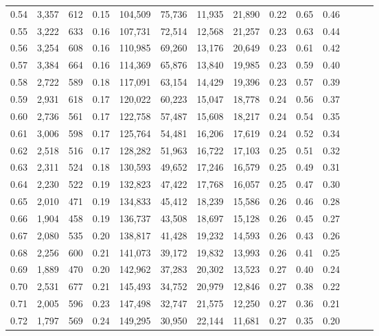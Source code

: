 \begin{tabular}{rrrrrrrrrrrrrr}
0.54 &  3,357 &  612 &  0.15 &  104,509 &   75,736 &  11,935 &  21,890 &  0.22 &  0.65 &      0.46 \\
0.55 &  3,222 &  633 &  0.16 &  107,731 &   72,514 &  12,568 &  21,257 &  0.23 &  0.63 &      0.44 \\
0.56 &  3,254 &  608 &  0.16 &  110,985 &   69,260 &  13,176 &  20,649 &  0.23 &  0.61 &      0.42 \\
0.57 &  3,384 &  664 &  0.16 &  114,369 &   65,876 &  13,840 &  19,985 &  0.23 &  0.59 &      0.40 \\
0.58 &  2,722 &  589 &  0.18 &  117,091 &   63,154 &  14,429 &  19,396 &  0.23 &  0.57 &      0.39 \\
0.59 &  2,931 &  618 &  0.17 &  120,022 &   60,223 &  15,047 &  18,778 &  0.24 &  0.56 &      0.37 \\
0.60 &  2,736 &  561 &  0.17 &  122,758 &   57,487 &  15,608 &  18,217 &  0.24 &  0.54 &      0.35 \\
0.61 &  3,006 &  598 &  0.17 &  125,764 &   54,481 &  16,206 &  17,619 &  0.24 &  0.52 &      0.34 \\
0.62 &  2,518 &  516 &  0.17 &  128,282 &   51,963 &  16,722 &  17,103 &  0.25 &  0.51 &      0.32 \\
0.63 &  2,311 &  524 &  0.18 &  130,593 &   49,652 &  17,246 &  16,579 &  0.25 &  0.49 &      0.31 \\
0.64 &  2,230 &  522 &  0.19 &  132,823 &   47,422 &  17,768 &  16,057 &  0.25 &  0.47 &      0.30 \\
0.65 &  2,010 &  471 &  0.19 &  134,833 &   45,412 &  18,239 &  15,586 &  0.26 &  0.46 &      0.28 \\
0.66 &  1,904 &  458 &  0.19 &  136,737 &   43,508 &  18,697 &  15,128 &  0.26 &  0.45 &      0.27 \\
0.67 &  2,080 &  535 &  0.20 &  138,817 &   41,428 &  19,232 &  14,593 &  0.26 &  0.43 &      0.26 \\
0.68 &  2,256 &  600 &  0.21 &  141,073 &   39,172 &  19,832 &  13,993 &  0.26 &  0.41 &      0.25 \\
0.69 &  1,889 &  470 &  0.20 &  142,962 &   37,283 &  20,302 &  13,523 &  0.27 &  0.40 &      0.24 \\
0.70 &  2,531 &  677 &  0.21 &  145,493 &   34,752 &  20,979 &  12,846 &  0.27 &  0.38 &      0.22 \\
0.71 &  2,005 &  596 &  0.23 &  147,498 &   32,747 &  21,575 &  12,250 &  0.27 &  0.36 &      0.21 \\
0.72 &  1,797 &  569 &  0.24 &  149,295 &   30,950 &  22,144 &  11,681 &  0.27 &  0.35 &      0.20 \\

\end{tabular}
